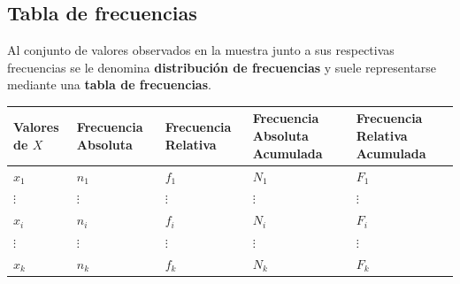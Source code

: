 \documentclass[
  spanish,
  a4paper,
]{scrreport}
\newcounter{none} %
\theoremstyle{plain}
\theoremstyle{definition}
\theoremstyle{definition}
\theoremstyle{remark}
\begin{document}
\subsection{Tabla de frecuencias}\label{tabla-de-frecuencias}

Al conjunto de valores observados en la muestra junto a sus respectivas
frecuencias se le denomina \textbf{distribución de frecuencias} y suele
representarse mediante una \textbf{tabla de frecuencias}.

{\def\LTcaptype{none} %
\begin{longtable}[]{@{}
  >{\centering\arraybackslash}p{}
  >{\centering\arraybackslash}p{}
  >{\centering\arraybackslash}p{}
  >{\centering\arraybackslash}p{}
  >{\centering\arraybackslash}p{}@{}}
\toprule\noalign{}
\begin{minipage}[b]{\linewidth}\centering
Valores de \(X\)
\end{minipage} & \begin{minipage}[b]{\linewidth}\centering
Frecuencia Absoluta
\end{minipage} & \begin{minipage}[b]{\linewidth}\centering
Frecuencia Relativa
\end{minipage} & \begin{minipage}[b]{\linewidth}\centering
Frecuencia Absoluta Acumulada
\end{minipage} & \begin{minipage}[b]{\linewidth}\centering
Frecuencia Relativa Acumulada
\end{minipage} \\
\midrule\noalign{}
\endhead
\bottomrule\noalign{}
\endlastfoot
\(x_1\) & \(n_1\) & \(f_1\) & \(N_1\) & \(F_1\) \\
\(\vdots\) & \(\vdots\) & \(\vdots\) & \(\vdots\) & \(\vdots\) \\
\(x_i\) & \(n_i\) & \(f_i\) & \(N_i\) & \(F_i\) \\
\(\vdots\) & \(\vdots\) & \(\vdots\) & \(\vdots\) & \(\vdots\) \\
\(x_k\) & \(n_k\) & \(f_k\) & \(N_k\) & \(F_k\) \\
\end{longtable}
}
\end{document}

